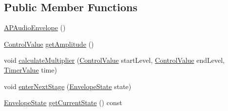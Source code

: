 \subsection*{Public Member Functions}
\begin{DoxyCompactItemize}
\item 
\hyperlink{class_a_p_audio_envelope_a6e29c4b6f4d1e9e3344073fc5934487a}{A\+P\+Audio\+Envelope} ()
\item 
\hyperlink{_a_p_audio_module_8h_a9219378a2632ccf0389d00317ce8cdc4}{Control\+Value} \hyperlink{class_a_p_audio_envelope_a9d2da7832ecf1e6434420b6fbed1f9ce}{get\+Amplitude} ()
\item 
void \hyperlink{class_a_p_audio_envelope_af1267f79ac5b3e5524a1637f9746356d}{calculate\+Multiplier} (\hyperlink{_a_p_audio_module_8h_a9219378a2632ccf0389d00317ce8cdc4}{Control\+Value} start\+Level, \hyperlink{_a_p_audio_module_8h_a9219378a2632ccf0389d00317ce8cdc4}{Control\+Value} end\+Level, \hyperlink{_a_p_audio_module_8h_a7d836cc51adbed3f66d5c4c91ed72e94}{Timer\+Value} time)
\item 
void \hyperlink{class_a_p_audio_envelope_ae981e46fc12b69f92a19852b9fb99d1c}{enter\+Next\+Stage} (\hyperlink{class_a_p_audio_envelope_aed3a129a289360005327919f10ce02b9}{Envelope\+State} state)
\item 
\hyperlink{class_a_p_audio_envelope_aed3a129a289360005327919f10ce02b9}{Envelope\+State} \hyperlink{class_a_p_audio_envelope_af4e278663ff265641e0b155de35dedc8}{get\+Current\+State} () const 
\end{DoxyCompactItemize}


